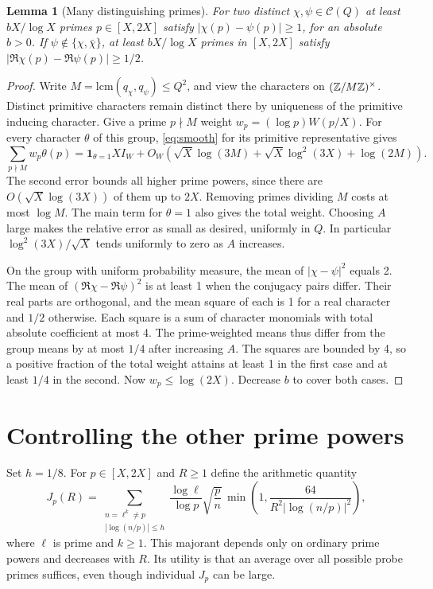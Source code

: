 \documentclass[11pt,letterpaper]{article}
\newtheorem{lemma}[theorem]{Lemma}
\begin{document}
\begin{lemma}[Many distinguishing primes]\label{lem:primes}
For two distinct $\chi,\psi\in\mathcal C(Q)$ at least $b X/\log X$ primes $p\in[X,2X]$ satisfy $|\chi(p)-\psi(p)|\ge1$, for an absolute $b>0$. If $\psi\notin\{\chi,\bar\chi\}$, at least $b X/\log X$ primes in $[X,2X]$ satisfy $|\Re\chi(p)-\Re\psi(p)|\ge1/2$.
\end{lemma}
\begin{proof}
Write $M=\mathrm{lcm}(q_\chi,q_\psi)\le Q^2$, and view the characters on $(\mathbb Z/M\mathbb Z)^\times$. Distinct primitive characters remain distinct there by uniqueness of the primitive inducing character. Give a prime $p\nmid M$ weight $w_p=(\log p)W(p/X)$. For every character $\theta$ of this group, \eqref{eq:smooth} for its primitive representative gives
\[
 \sum_{p\nmid M}w_p\theta(p)=\boldsymbol1_{\theta=1}X I_W
 +O_W(\sqrt X\log(3M)+\sqrt X\log^2(3X)+\log(2M)).
\]
The second error bounds all higher prime powers, since there are $O(\sqrt X\log(3X))$ of them up to $2X$. Removing primes dividing $M$ costs at most $\log M$. The main term for $\theta=1$ also gives the total weight. Choosing $A$ large makes the relative error as small as desired, uniformly in $Q$. In particular $\log^2(3X)/\sqrt X$ tends uniformly to zero as $A$ increases.

On the group with uniform probability measure, the mean of $|\chi-\psi|^2$ equals 2. The mean of $(\Re\chi-\Re\psi)^2$ is at least 1 when the conjugacy pairs differ. Their real parts are orthogonal, and the mean square of each is 1 for a real character and $1/2$ otherwise. Each square is a sum of character monomials with total absolute coefficient at most 4. The prime-weighted means thus differ from the group means by at most $1/4$ after increasing $A$. The squares are bounded by 4, so a positive fraction of the total weight attains at least 1 in the first case and at least $1/4$ in the second. Now $w_p\le\log(2X)$. Decrease $b$ to cover both cases.
\end{proof}

\section{Controlling the other prime powers}
Set $h=1/8$. For $p\in[X,2X]$ and $R\ge1$ define the arithmetic quantity
\begin{equation}\label{eq:leak}
 J_p(R)=
 \sum_{\substack{n=\ell^k\ne p\\ |\log(n/p)|\le h}}
 \frac{\log\ell}{\log p}\sqrt{\frac pn}\,
 \min\!\left(1,\frac{64}{R^2|\log(n/p)|^2}\right),
\end{equation}
where $\ell$ is prime and $k\ge1$. This majorant depends only on ordinary prime powers and decreases with $R$. Its utility is that an average over all possible probe primes suffices, even though individual $J_p$ can be large.
\end{document}

